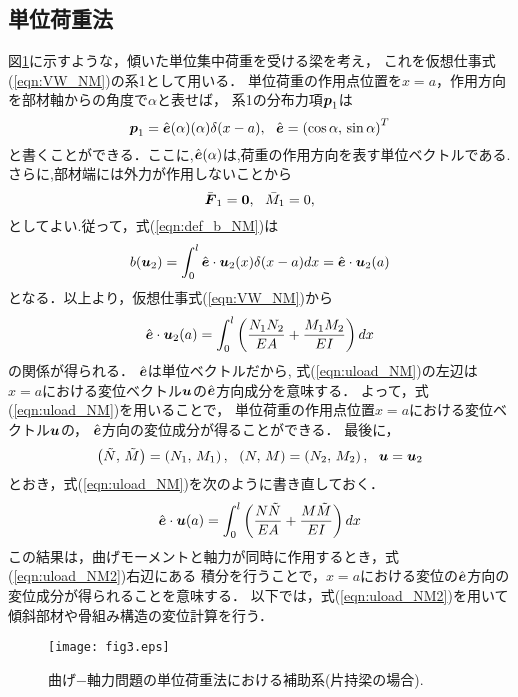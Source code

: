 ﻿\documentclass[10pt,a4j]{jarticle}
\begin{document}
\subsection{単位荷重法}
図\ref{fig:fig3}に示すような，傾いた単位集中荷重を受ける梁を考え，
これを仮想仕事式(\ref{eqn:VW_NM})の系1として用いる．
単位荷重の作用点位置を$x=a$，作用方向を部材軸からの角度で$\alpha$と表せば，
系1の分布力項$\mbox{\boldmath $p$}_1$は
\begin{equation}
	\fat{p}_1=\hat{\fat{e}}(\alpha)(\alpha)\delta(x-a), \ \ 
	\hat{\fat{e}}=\left( \cos\alpha,\, \sin \alpha \right)^T
	\label{eqn:aux}
\end{equation}
と書くことができる．ここに,$\hat{\mbox{\boldmath $e$}}(\alpha)$は,荷重の作用方向を表す単位ベクトルである.
さらに,部材端には外力が作用しないことから
\begin{equation}
	\bar{\mbox{\boldmath $F$}}_1=\mbox{\boldmath $0$},\ \ \bar M_1=0,
	\label{eqn:aux}
\end{equation}
としてよい.従って，式(\ref{eqn:def_b_NM})は
\begin{equation}
	b(\mbox{\boldmath $u$}_2)=
	\int_0^l \hat{\mbox{\boldmath $e$}}\cdot \mbox{\boldmath $u$}_2(x)\delta(x-a) dx
	=
	\hat{\mbox{\boldmath $e$}}\cdot\mbox{\boldmath $u$}_2(a) 
	\label{eqn:dlt_smp}
\end{equation}
となる．以上より，仮想仕事式(\ref{eqn:VW_NM})から
\begin{equation}
	\hat{\mbox{\boldmath $e$}}\cdot\mbox{\boldmath $u$}_2(a) 
	=
	\int_0^l \left( \frac{N_1N_2}{EA}+ \frac{M_1M_2}{EI} \right) dx 
	\label{eqn:uload_NM}
\end{equation}
の関係が得られる．
$\hat{\mbox{\boldmath $e$}}$は単位ベクトルだから, 式(\ref{eqn:uload_NM})の左辺は
$x=a$における変位ベクトル$\mbox{\boldmath $u$}$の$\hat{\mbox{\boldmath $e$}}$方向成分を意味する．
よって，式(\ref{eqn:uload_NM})を用いることで，
単位荷重の作用点位置$x=a$における変位ベクトル$\mbox{\boldmath $u$}$の，
$\hat{\mbox{\boldmath $e$}}$方向の変位成分が得ることができる．
最後に，
\begin{equation}
	\left( \tilde{N},\, \tilde{M}\right)= \left(N_1,\, M_1\right), \ \ 
	\left( N,\, M\right)= \left(N_2,\, M_2\right), \ \ \fat{u}=\fat{u}_2
	\label{eqn:}
\end{equation}
とおき，式(\ref{eqn:uload_NM})を次のように書き直しておく．
\begin{equation}
	\hat{\mbox{\boldmath $e$}}\cdot\mbox{\boldmath $u$}(a) 
	=
	\int_0^l \left( \frac{N \tilde N }{EA}+ \frac{M \tilde M }{EI} \right) dx 
	\label{eqn:uload_NM2}
\end{equation}
この結果は，曲げモーメントと軸力が同時に作用するとき，式(\ref{eqn:uload_NM2})右辺にある
積分を行うことで，$x=a$における変位の$\hat{\mbox{\boldmath $e$}}$方向の変位成分が得られることを意味する．
以下では，式(\ref{eqn:uload_NM2})を用いて傾斜部材や骨組み構造の変位計算を行う．
\begin{figure}[h]
	\begin{center}
	\texttt{[image: fig3.eps]} 
	\end{center}
	\caption{曲げ−軸力問題の単位荷重法における補助系(片持梁の場合).} 
	\label{fig:fig3}
\end{figure}
\end{document}
